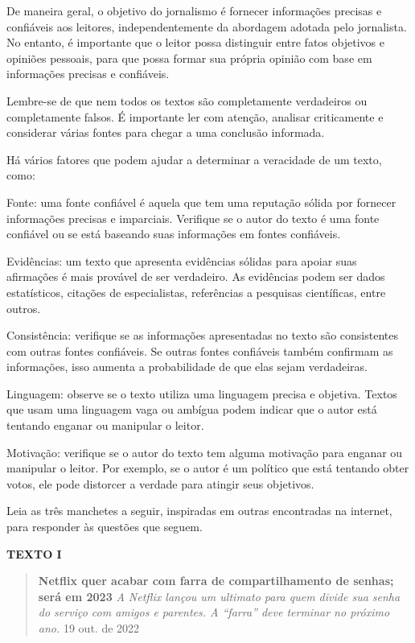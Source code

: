 {De maneira geral, o objetivo do jornalismo é fornecer informações
precisas e confiáveis aos leitores, independentemente da abordagem
adotada pelo jornalista. No entanto, é importante que o leitor possa
distinguir entre fatos objetivos e opiniões pessoais, para que possa
formar sua própria opinião com base em informações precisas e
confiáveis.

Lembre-se de que nem todos os textos são completamente verdadeiros ou
completamente falsos. É importante ler com atenção, analisar
criticamente e considerar várias fontes para chegar a uma conclusão
informada.

Há vários fatores que podem ajudar a determinar a veracidade de um
texto, como:

Fonte: uma fonte confiável é aquela que tem uma reputação
sólida por fornecer informações precisas e imparciais. Verifique se o
autor do texto é uma fonte confiável ou se está baseando suas
informações em fontes confiáveis.

Evidências: um texto que apresenta evidências sólidas para apoiar suas
afirmações é mais provável de ser verdadeiro. As evidências podem ser
dados estatísticos, citações de especialistas, referências a pesquisas
científicas, entre outros.

Consistência: verifique se as informações apresentadas no texto são
consistentes com outras fontes confiáveis. Se outras fontes confiáveis
também confirmam as informações, isso aumenta a probabilidade de que
elas sejam verdadeiras.

Linguagem: observe se o texto utiliza uma linguagem precisa e objetiva.
Textos que usam uma linguagem vaga ou ambígua podem indicar que o autor
está tentando enganar ou manipular o leitor.

Motivação: verifique se o autor do texto tem alguma motivação para
enganar ou manipular o leitor. Por exemplo, se o autor é um político que
está tentando obter votos, ele pode distorcer a verdade para atingir
seus objetivos.}

Leia as três manchetes a seguir, inspiradas em outras encontradas na
internet, para responder às questões que seguem.

\textbf{TEXTO I}

\begin{quote}
\textbf{Netflix quer acabar com farra de compartilhamento de senhas;
será em 2023} \emph{A Netflix lançou um ultimato para quem divide sua
senha do serviço com amigos e parentes. A ``farra'' deve terminar no
próximo ano.} 19 out. de 2022
\end{quote}

